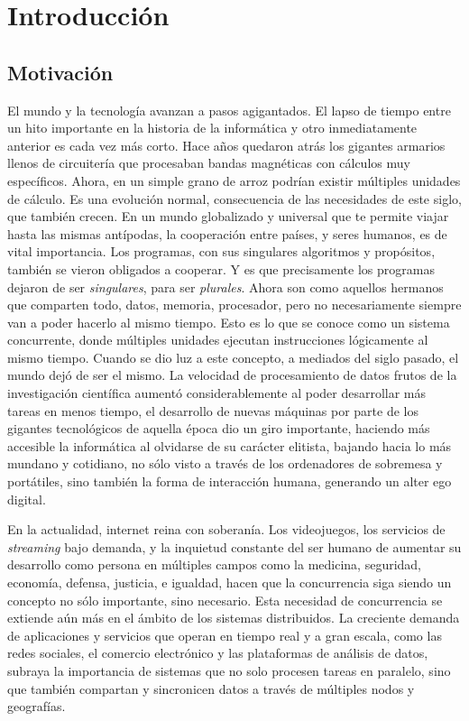 \chapter{\textbf{Introducción}}

\section{Motivación}
El mundo y la tecnología avanzan a pasos agigantados. El lapso de tiempo entre un hito importante en la historia de la informática y otro inmediatamente anterior es cada vez más corto. Hace años quedaron atrás los gigantes armarios llenos de circuitería que procesaban bandas magnéticas con cálculos muy específicos. Ahora, en un simple grano de arroz podrían existir múltiples unidades de cálculo. Es una evolución normal, consecuencia de las necesidades de este siglo, que también crecen. En un mundo globalizado y universal que te permite viajar hasta las mismas antípodas, la cooperación entre países, y seres humanos, es de vital importancia. Los programas, con sus singulares algoritmos y propósitos, también se vieron obligados a cooperar. Y es que precisamente los programas dejaron de ser \textit{singulares}, para ser \textit{plurales}. Ahora son como aquellos hermanos que comparten todo, datos, memoria, procesador, pero no necesariamente siempre van a poder hacerlo al mismo tiempo. Esto es lo que se conoce como un sistema concurrente, donde múltiples unidades ejecutan instrucciones lógicamente al mismo tiempo. Cuando se dio luz a este concepto, a mediados del siglo pasado, el mundo dejó de ser el mismo. La velocidad de procesamiento de datos frutos de la investigación científica aumentó considerablemente al poder desarrollar más tareas en menos tiempo, el desarrollo de nuevas máquinas por parte de los gigantes tecnológicos de aquella época dio un giro importante, haciendo más accesible la informática al olvidarse de su carácter elitista, bajando hacia lo más mundano y cotidiano, no sólo visto a través de los ordenadores de sobremesa y portátiles, sino también la forma de interacción humana, generando un alter ego digital. 

En la actualidad, internet reina con soberanía. Los videojuegos, los servicios de \textit{streaming} bajo demanda, y la inquietud constante del ser humano de aumentar su desarrollo como persona en múltiples campos como la medicina, seguridad, economía, defensa, justicia, e igualdad, hacen que la concurrencia siga siendo un concepto no sólo importante, sino necesario. Esta necesidad de concurrencia se extiende aún más en el ámbito de los sistemas distribuidos. La creciente demanda de aplicaciones y servicios que operan en tiempo real y a gran escala, como las redes sociales, el comercio electrónico y las plataformas de análisis de datos, subraya la importancia de sistemas que no solo procesen tareas en paralelo, sino que también compartan y sincronicen datos a través de múltiples nodos y geografías.


